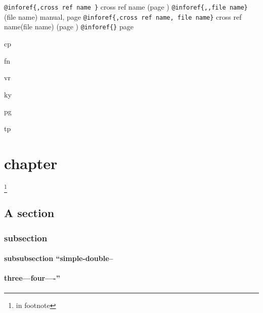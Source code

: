\documentclass{book}
\begin{document}
\texttt{@inforef\{,cross ref name \}} cross ref name (page \pageref{anchor:})
\texttt{@inforef\{,,file name\}} (file name) manual, page \pageref{anchor:}
\texttt{@inforef\{,cross ref name, file name\}} cross ref name(file name) (page \pageref{anchor:})
\texttt{@inforef\{\}} page \pageref{anchor:}





cp
\printindex

fn
\printindex

vr
\printindex

ky
\printindex

pg
\printindex

tp
\printindex



\label{anchor:chapter}\chapter{chapter}

\footnote{in footnote}


\label{anchor:s_002d_002dect_002cion}\section{A section}


\label{anchor:subsection}\subsection{subsection}


\label{anchor:anchor}
\label{anchor:subsubsection-_0060_0060simple_002ddouble_002d_002d}\subsubsection{subsubsection ``simple-double--}

\label{anchor:subsubsection-three_002d_002d_002dfour_002d_002d_002d_002d_0027_0027}\subsubsection{three---four----''}

\label{anchor:chapter2}
\printindex
\printindex

\tableofcontents\newpage
\end{document}
